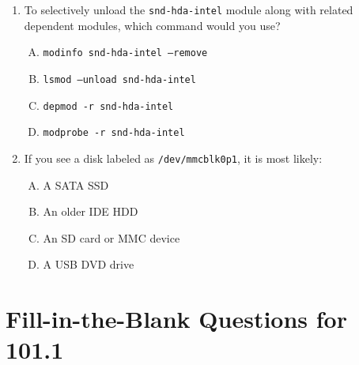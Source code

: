 \documentclass[12pt,a4paper]{report}
\begin{document}
\begin{enumerate}[1.]
\item To selectively unload the \texttt{snd-hda-intel} module along with related dependent modules, which command would you use?
  \begin{enumerate}[A)]
    \item \texttt{modinfo snd-hda-intel --remove}
    \item \texttt{lsmod --unload snd-hda-intel}
    \item \texttt{depmod -r snd-hda-intel}
    \item \texttt{modprobe -r snd-hda-intel}
  \end{enumerate}

\item If you see a disk labeled as \texttt{/dev/mmcblk0p1}, it is most likely:
  \begin{enumerate}[A)]
    \item A SATA SSD
    \item An older IDE HDD
    \item An SD card or MMC device
    \item A USB DVD drive
  \end{enumerate}
\end{enumerate}

\section*{Fill-in-the-Blank Questions for 101.1}
\end{document}
